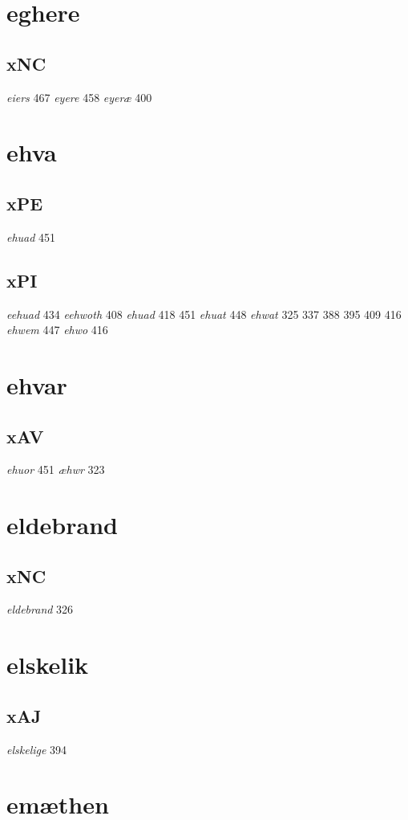 \documentclass[a4paper,twocolumn]{article}
\begin{document}
\section{eghere}
\label{sec:org366791c}
\subsection{xNC}
\label{sec:orgfc2f067}
\emph{eiers} 467 \emph{eyere} 458 \emph{eyeræ} 400 
\section{ehva}
\label{sec:org3ed670e}
\subsection{xPE}
\label{sec:org66fa43a}
\emph{ehuad} 451 
\subsection{xPI}
\label{sec:org601fcd9}
\emph{eehuad} 434 \emph{eehwoth} 408 \emph{ehuad} 418 451 \emph{ehuat} 448 \emph{ehwat} 325 337 388 395 409 416 \emph{ehwem} 447 \emph{ehwo} 416 
\section{ehvar}
\label{sec:org43953cc}
\subsection{xAV}
\label{sec:org877a43b}
\emph{ehuor} 451 \emph{æhwr} 323 
\section{eldebrand}
\label{sec:orge0c9210}
\subsection{xNC}
\label{sec:org288621c}
\emph{eldebrand} 326 
\section{elskelik}
\label{sec:org50cd137}
\subsection{xAJ}
\label{sec:org29bacd9}
\emph{elskelige} 394 
\section{emæthen}
\label{sec:org6ebd916}
\end{document}
